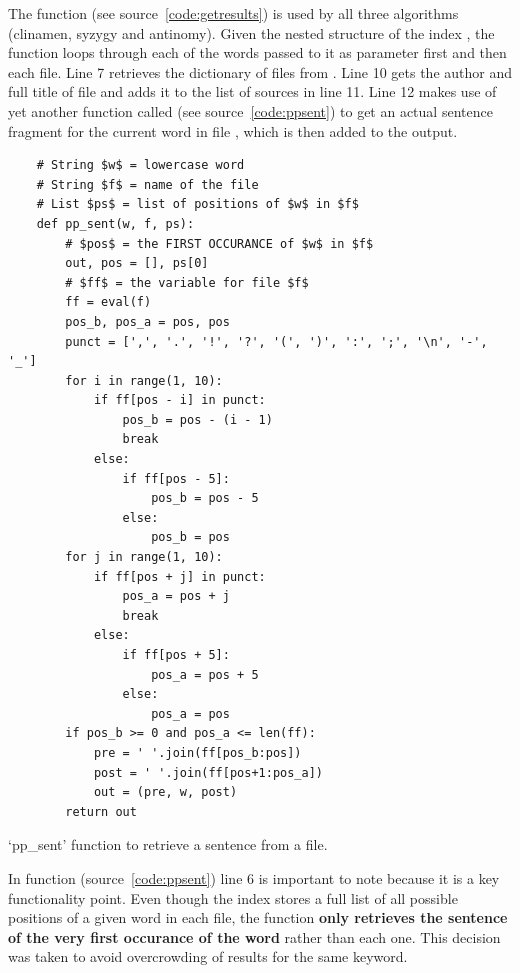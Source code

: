 The  function (see source~\ref{code:getresults}) is used by all three algorithms (clinamen, syzygy and antinomy). Given the nested structure of the index , the function loops through each of the words passed to it as parameter  first and then each file. Line 7 retrieves the dictionary of files from . Line 10 gets the author and full title of file  and adds it to the list of sources in line 11. Line 12 makes use of yet another function called  (see source~\ref{code:ppsent}) to get an actual sentence fragment for the current word  in file , which is then added to the output.

\begin{listing}
  \begin{verbatim}
    # String $w$ = lowercase word
    # String $f$ = name of the file
    # List $ps$ = list of positions of $w$ in $f$
    def pp_sent(w, f, ps):
        # $pos$ = the FIRST OCCURANCE of $w$ in $f$
        out, pos = [], ps[0]
        # $ff$ = the variable for file $f$
        ff = eval(f)
        pos_b, pos_a = pos, pos
        punct = [',', '.', '!', '?', '(', ')', ':', ';', '\n', '-', '_']
        for i in range(1, 10):
            if ff[pos - i] in punct:
                pos_b = pos - (i - 1)
                break
            else:
                if ff[pos - 5]:
                    pos_b = pos - 5
                else:
                    pos_b = pos
        for j in range(1, 10):
            if ff[pos + j] in punct:
                pos_a = pos + j
                break
            else:
                if ff[pos + 5]:
                    pos_a = pos + 5
                else:
                    pos_a = pos
        if pos_b >= 0 and pos_a <= len(ff):
            pre = ' '.join(ff[pos_b:pos])
            post = ' '.join(ff[pos+1:pos_a])
            out = (pre, w, post)
        return out
  \end{verbatim}
\caption{`pp\_sent' function to retrieve a sentence from a file.}
\label{code:ppsent}
\end{listing}

In function  (source~\ref{code:ppsent}) line 6 is important to note because it is a key functionality point. Even though the index  stores a full list of all possible positions of a given word in each file, the  function \textbf{only retrieves the sentence of the very first occurance of the word} rather than each one. This decision was taken to avoid overcrowding of results for the same keyword.

